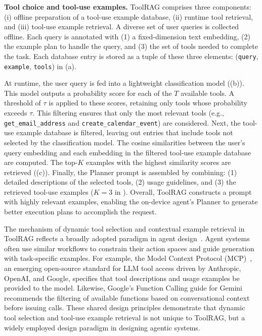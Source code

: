 {\bf Tool choice and tool-use examples.} ToolRAG comprises three components: (i) offline preparation of a tool-use example database, (ii) runtime tool retrieval, and (iii) tool-use example retrieval. A diverse set of user queries is collected offline. Each query is annotated with (1) a fixed-dimension text embedding, (2) the example plan to handle the query, and (3) the set of tools needed to complete the task. Each database entry is stored as a tuple of these three elements: (\texttt{query}, \texttt{example}, \texttt{tools}) in (a).

At runtime, the user query is fed into a lightweight classification model ((b)). This model outputs a probability score for each of the $T$ available tools. A threshold of $\tau$ is applied to these scores, retaining only tools whose probability exceeds $\tau$. This filtering ensures that only the most relevant tools (e.g., \texttt{get\_email\_address} and \texttt{create\_calendar\_event}) are considered. Next, the tool-use example database is filtered, leaving out entries that include tools not selected by the classification model. The cosine similarities between the user's query embedding and each embedding in the filtered tool-use example database are computed. The top-$K$ examples with the highest similarity scores are retrieved ((c)). Finally, the Planner prompt is assembled by combining: (1) detailed descriptions of the selected tools, (2) usage guidelines, and (3) the retrieved tool-use examples ($K=3$ in ). Overall, ToolRAG constructs a prompt with highly relevant examples, enabling the on-device agent's Planner to generate better execution plans to accomplish the request.

The mechanism of dynamic tool selection and contextual example retrieval in ToolRAG reflects a broadly adopted paradigm in agent design~\cite{mcp, rag_mcp, toolformer, hugginggpt, llama3}. Agent systems often use similar workflows to constrain their action spaces and guide generation with task-specific examples. For example, the Model Context Protocol (MCP)~\cite{mcp}, an emerging open-source standard for LLM tool access driven by Anthropic, OpenAI, and Google, specifies that tool descriptions and usage examples be provided to the model. Likewise, Google’s Function Calling guide for Gemini~\cite{google_dev_function_calling, hera_agent} recommends the filtering of available functions based on conversational context before issuing calls. These shared design principles demonstrate that dynamic tool selection and tool-use example retrieval is not unique to ToolRAG, but a widely employed design paradigm in designing agentic systems.


